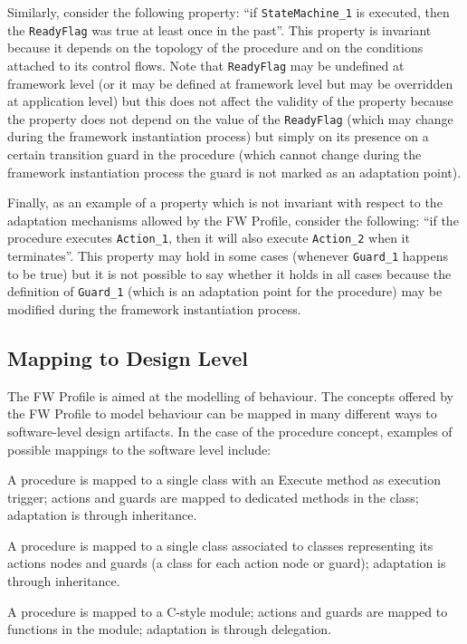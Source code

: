 \documentclass[definition]{../fwprofile}
\begin{document}
Similarly, consider the following property: “if \texttt{StateMachine\_1} is executed,
then the \texttt{ReadyFlag} was true at least once in the past”. This property is invariant because it depends on the topology of the procedure and on the conditions attached to its control flows. Note that \texttt{ReadyFlag} may be undefined at framework level (or it may be defined at framework level but may be overridden at application level) but this does not affect the validity of the property because the property does not depend on the value of the \texttt{ReadyFlag} (which may change during the framework instantiation process) but simply on its presence on a certain transition guard in the procedure (which cannot change during the framework instantiation process the guard is not marked as an adaptation point).

Finally, as an example of a property which is not invariant with respect to the adaptation
mechanisms allowed by the FW Profile, consider the following: “if the procedure executes
\texttt{Action\_1}, then it will also execute \texttt{Action\_2} when it terminates”. This property may hold in some cases (whenever \texttt{Guard\_1} happens to be true) but it is not possible to say whether it holds in all cases because the definition of \texttt{Guard\_1} (which is an adaptation point for the procedure) may be modified during the framework instantiation process.

\subsection{Mapping to Design Level}\label{sec:procMappingToDesignLevel} 
The FW Profile is aimed at the modelling of behaviour. The concepts offered by the FW
Profile to model behaviour can be mapped in many different ways to software-level design
artifacts. In the case of the procedure concept, examples of possible mappings to the software level include:

\begin{fw_itemize} 
\item A procedure is mapped to a single class with an Execute method as execution trigger;
actions and guards are mapped to dedicated methods in the class; adaptation is through inheritance.
\item A procedure is mapped to a single class associated to classes representing its actions 
nodes and guards (a class for each action node or guard); adaptation is through inheritance.
\item A procedure is mapped to a C-style module; actions and guards are mapped to functions 
in the module; adaptation is through delegation.
\end{fw_itemize}
\end{document}
